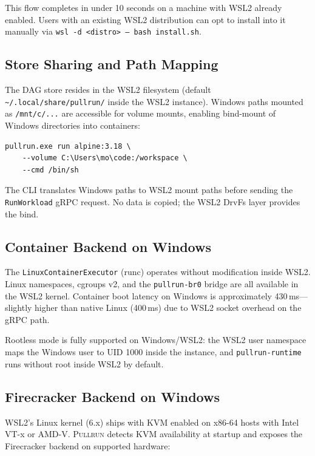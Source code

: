\documentclass[11pt,a4paper]{article}
\newcommand{\pullrun}{\textsc{Pullrun}}
\begin{document}
This flow completes in under 10 seconds on a machine with WSL2 already enabled. Users with an existing WSL2 distribution can opt to install into it manually via \texttt{wsl -d <distro> -- bash install.sh}.

\subsection{Store Sharing and Path Mapping}

The DAG store resides in the WSL2 filesystem (default \texttt{\textasciitilde/.local/share/pullrun/} inside the WSL2 instance). Windows paths mounted as \texttt{/mnt/c/...} are accessible for volume mounts, enabling bind-mount of Windows directories into containers:

\begin{verbatim}
pullrun.exe run alpine:3.18 \
    --volume C:\Users\mo\code:/workspace \
    --cmd /bin/sh
\end{verbatim}

The CLI translates Windows paths to WSL2 mount paths before sending the \texttt{RunWorkload} gRPC request. No data is copied; the WSL2 DrvFs layer provides the bind.

\subsection{Container Backend on Windows}

The \texttt{LinuxContainerExecutor} (runc) operates without modification inside WSL2. Linux namespaces, cgroups v2, and the \texttt{pullrun-br0} bridge are all available in the WSL2 kernel. Container boot latency on Windows is approximately 430\,ms---slightly higher than native Linux (400\,ms) due to WSL2 socket overhead on the gRPC path.

Rootless mode is fully supported on Windows/WSL2: the WSL2 user namespace maps the Windows user to UID 1000 inside the instance, and \texttt{pullrun-runtime} runs without root inside WSL2 by default.

\subsection{Firecracker Backend on Windows}

WSL2's Linux kernel (6.x) ships with KVM enabled on x86-64 hosts with Intel VT-x or AMD-V. \pullrun{} detects KVM availability at startup and exposes the Firecracker backend on supported hardware:
\end{document}
